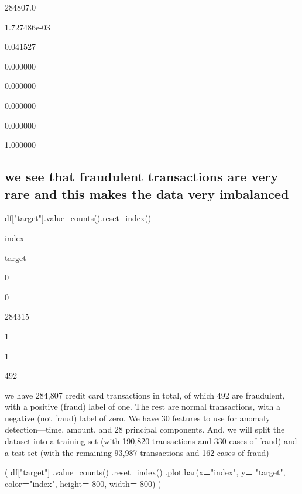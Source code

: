 \documentclass[
]{article}
\newenvironment{Shaded}{\begin{snugshade}}{\end{snugshade}}
\newcommand{\DecValTok}[1]{\textcolor[rgb]{0.00,0.00,0.81}{#1}}
\newcommand{\NormalTok}[1]{#1}
\newcommand{\OperatorTok}[1]{\textcolor[rgb]{0.81,0.36,0.00}{\textbf{#1}}}
\newcommand{\StringTok}[1]{\textcolor[rgb]{0.31,0.60,0.02}{#1}}
\begin{document}
284807.0

1.727486e-03

0.041527

0.000000

0.000000

0.000000

0.000000

1.000000

\hypertarget{we-see-that-fraudulent-transactions-are-very-rare-and-this-makes-the-data-very-imbalanced}{%
\subsection{we see that fraudulent transactions are very rare and this
makes the data very
imbalanced}\label{we-see-that-fraudulent-transactions-are-very-rare-and-this-makes-the-data-very-imbalanced}}

\begin{Shaded}
\begin{Highlighting}[]
\NormalTok{df[}\StringTok{"target"}\NormalTok{].value\_counts().reset\_index()}
\end{Highlighting}
\end{Shaded}

index

target

0

0

284315

1

1

492

we have 284,807 credit card transactions in total, of which 492 are
fraudulent, with a positive (fraud) label of one. The rest are normal
transactions, with a negative (not fraud) label of zero. We have 30
features to use for anomaly detection---time, amount, and 28 principal
components. And, we will split the dataset into a training set (with
190,820 transactions and 330 cases of fraud) and a test set (with the
remaining 93,987 transactions and 162 cases of fraud)

\begin{Shaded}
\begin{Highlighting}[]
\NormalTok{(}
\NormalTok{df[}\StringTok{"target"}\NormalTok{]}
\NormalTok{.value\_counts()}
\NormalTok{.reset\_index()}
\NormalTok{.plot.bar(x}\OperatorTok{=}\StringTok{"index"}\NormalTok{, y}\OperatorTok{=} \StringTok{"target"}\NormalTok{, color}\OperatorTok{=}\StringTok{"index"}\NormalTok{, height}\OperatorTok{=} \DecValTok{800}\NormalTok{, width}\OperatorTok{=} \DecValTok{800}\NormalTok{)}
\NormalTok{ )}
\end{Highlighting}
\end{Shaded}
\end{document}
